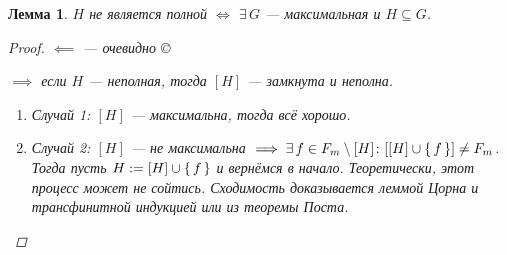 \documentclass[12pt]{article}
\let\un\cup
\let\wot\setminus
\theoremstyle{definition}
\theoremstyle{plain}
\newtheorem{lemma}{Лемма}[section]
\theoremstyle{remark}
\begin{document}
\begin{lemma}
  $H$ не является полной $\iff$ $\exists\, G$ --- максимальная и $H
  \subseteq G$.
  \begin{proof}
    $\impliedby$ --- очевидно \copyright

    $\implies$ если $H$ --- неполная, тогда $[H]$ --- замкнута и неполна.
    \begin{enumerate}
      \item Случай 1: $[H]$ --- максимальна, тогда всё хорошо.

      \item Случай 2: $[H]$ --- не максимальна $\implies \exists\, f
        \in F_m \wot [H] \colon [[H] \un \set{f}] \neq F_m$. Тогда
        пусть $H := [H] \un \set{f}$ и вернёмся в начало.
        Теоретически, этот процесс может не сойтись. Сходимость
        доказывается леммой Цорна и трансфинитной индукцией или из
        теоремы Поста.
    \end{enumerate}
  \end{proof}
\end{lemma}
\end{document}
